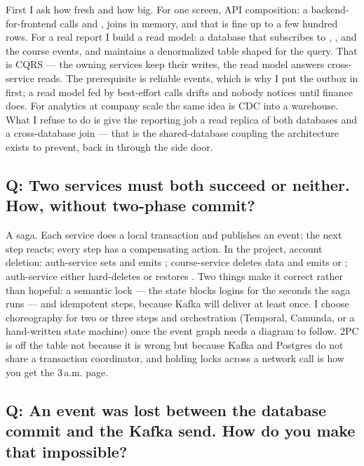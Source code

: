 First I ask how fresh and how big. For one screen, API composition: a
backend-for-frontend calls  and , joins
in memory, and that is fine up to a few hundred rows. For a real report
I build a read model: a  database that subscribes to
, , and the course events,
and maintains a denormalized  table shaped for the
query. That is CQRS --- the owning services keep their writes, the read
model answers cross-service reads. The prerequisite is reliable events,
which is why I put the outbox in first; a read model fed by best-effort
 calls drifts and nobody notices until finance does. For
analytics at company scale the same idea is CDC into a warehouse. What I
refuse to do is give the reporting job a read replica of both databases
and a cross-database join --- that is the shared-database coupling the
architecture exists to prevent, back in through the side door.

\subsection*{Q: Two services must both succeed or neither. How, without two-phase commit?}

A saga. Each service does a local transaction and publishes an event;
the next step reacts; every step has a compensating action. In the
project, account deletion: auth-service sets  and emits
; course-service deletes data and emits
 or ; auth-service either
hard-deletes or restores . Two things make it correct
rather than hopeful: a semantic lock --- the  state
blocks logins for the seconds the saga runs --- and idempotent steps,
because Kafka will deliver at least once. I choose choreography for two
or three steps and orchestration (Temporal, Camunda, or a hand-written
state machine) once the event graph needs a diagram to follow. 2PC is
off the table not because it is wrong but because Kafka and Postgres do
not share a transaction coordinator, and holding locks across a network
call is how you get the 3\,a.m. page.

\subsection*{Q: An event was lost between the database commit and the Kafka send. How do you make that impossible?}

